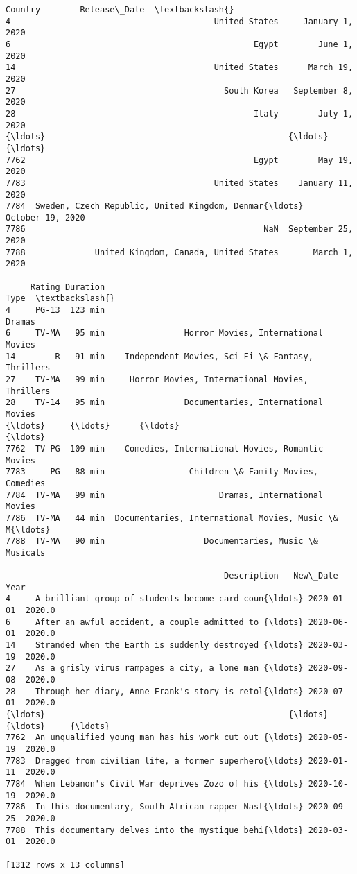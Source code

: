 \documentclass[11pt]{article}
\begin{document}
\begin{tcolorbox}[breakable, size=fbox, boxrule=.5pt, pad at break*=1mm, opacityfill=0]
\begin{Verbatim}[commandchars=\\\{\}]
                                                Country        Release\_Date  \textbackslash{}
4                                         United States     January 1, 2020
6                                                 Egypt        June 1, 2020
14                                        United States      March 19, 2020
27                                          South Korea   September 8, 2020
28                                                Italy        July 1, 2020
{\ldots}                                                 {\ldots}                 {\ldots}
7762                                              Egypt        May 19, 2020
7783                                      United States    January 11, 2020
7784  Sweden, Czech Republic, United Kingdom, Denmar{\ldots}    October 19, 2020
7786                                                NaN  September 25, 2020
7788              United Kingdom, Canada, United States       March 1, 2020

     Rating Duration                                               Type  \textbackslash{}
4     PG-13  123 min                                             Dramas
6     TV-MA   95 min                Horror Movies, International Movies
14        R   91 min    Independent Movies, Sci-Fi \& Fantasy, Thrillers
27    TV-MA   99 min     Horror Movies, International Movies, Thrillers
28    TV-14   95 min                Documentaries, International Movies
{\ldots}     {\ldots}      {\ldots}                                                {\ldots}
7762  TV-PG  109 min    Comedies, International Movies, Romantic Movies
7783     PG   88 min                 Children \& Family Movies, Comedies
7784  TV-MA   99 min                       Dramas, International Movies
7786  TV-MA   44 min  Documentaries, International Movies, Music \& M{\ldots}
7788  TV-MA   90 min                    Documentaries, Music \& Musicals

                                            Description   New\_Date    Year
4     A brilliant group of students become card-coun{\ldots} 2020-01-01  2020.0
6     After an awful accident, a couple admitted to {\ldots} 2020-06-01  2020.0
14    Stranded when the Earth is suddenly destroyed {\ldots} 2020-03-19  2020.0
27    As a grisly virus rampages a city, a lone man {\ldots} 2020-09-08  2020.0
28    Through her diary, Anne Frank's story is retol{\ldots} 2020-07-01  2020.0
{\ldots}                                                 {\ldots}        {\ldots}     {\ldots}
7762  An unqualified young man has his work cut out {\ldots} 2020-05-19  2020.0
7783  Dragged from civilian life, a former superhero{\ldots} 2020-01-11  2020.0
7784  When Lebanon's Civil War deprives Zozo of his {\ldots} 2020-10-19  2020.0
7786  In this documentary, South African rapper Nast{\ldots} 2020-09-25  2020.0
7788  This documentary delves into the mystique behi{\ldots} 2020-03-01  2020.0

[1312 rows x 13 columns]
\end{Verbatim}
\end{tcolorbox}
        
\end{document}
